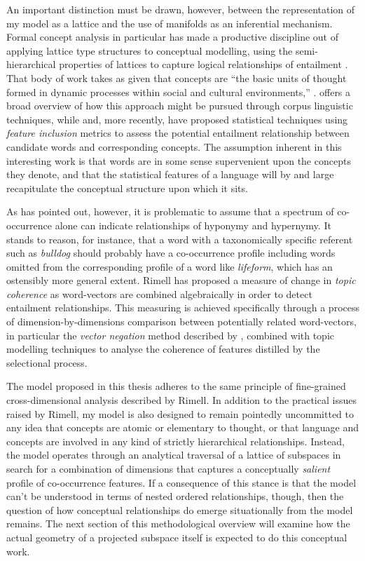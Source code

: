 {An important distinction must be drawn, however, between the representation of my model as a lattice and the use of manifolds as an inferential mechanism.  Formal concept analysis in particular has made a productive discipline out of applying lattice type structures to conceptual modelling, using the semi-hierarchical properties of lattices to capture logical relationships of entailment \citep{Wille1982}.  That body of work takes as given that concepts are ``the basic units of thought formed in dynamic processes within social and cultural environments,'' \citep[][p. 2]{Wille2005}.  \cite{Widdows2004} offers a broad overview of how this approach might be pursued through corpus linguistic techniques, while \cite{GeffetEA2005} and, more recently, \cite{KartsaklisEA2016} have proposed statistical techniques using \emph{feature inclusion} metrics to assess the potential entailment relationship between candidate words and corresponding concepts.  The assumption inherent in this interesting work is that words are in some sense supervenient upon the concepts they denote, and that the statistical features of a language will by and large recapitulate the conceptual structure upon which it sits.

As \cite{Rimell2014} has pointed out, however, it is problematic to assume that a spectrum of co-occurrence alone can indicate relationships of hyponymy and hypernymy.  It stands to reason, for instance, that a word with a taxonomically specific referent such as \emph{bulldog} should probably have a co-occurrence profile including words omitted from the corresponding profile of a word like \emph{lifeform}, which has an ostensibly more general extent.  Rimell has proposed a measure of change in \emph{topic coherence} as word-vectors are combined algebraically in order to detect entailment relationships.  This measuring is achieved specifically through a process of dimension-by-dimensions comparison between potentially related word-vectors, in particular the \emph{vector negation} method described by \cite{Widdows2003}, combined with topic modelling techniques to analyse the coherence of features distilled by the selectional process.

The model proposed in this thesis adheres to the same principle of fine-grained cross-dimensional analysis described by Rimell.  In addition to the practical issues raised by Rimell, my model is also designed to remain pointedly uncommitted to any idea that concepts are atomic or elementary to thought, or that language and concepts are involved in any kind of strictly hierarchical relationships.  Instead, the model operates through an analytical traversal of a lattice of subspaces in search for a combination of dimensions that captures a conceptually \emph{salient} profile of co-occurrence features.  If a consequence of this stance is that the model can't be understood in terms of nested ordered relationships, though, then the question of how conceptual relationships do emerge situationally from the model remains.  The next section of this methodological overview will examine how the actual geometry of a projected subspace itself is expected to do this conceptual work.

}
